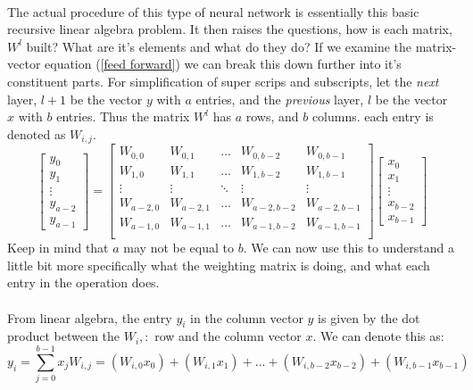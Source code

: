 \documentclass[12pt,letterpaper]{article}
\begin{document}
\paragraph*{}The actual procedure of this type of neural network is essentially this basic recursive linear algebra problem. It then raises the questions, how is each matrix, $W^l$ built? What are it's elements and what do they do? If we examine the matrix-vector equation (\ref{feed forward}) we can break this down further into it's constituent parts.
For simplification of super scrips and subscripts, let the \textit{next} layer, $l+1$ be the vector $y$ with $a$ entries, and the \textit{previous} layer, $l$ be the vector $x$ with $b$ entries. Thus the matrix $W^l$ has $a$ rows, and $b$ columns. each entry is denoted as $W_{i,j}$.
\begin{equation}
\label{mat-vec feed}
\begin{bmatrix}
y_0 \\ y_1 \\ \vdots \\ y_{a-2} \\ y_{a-1}
\end{bmatrix} =
\begin{bmatrix}
W_{0,0} & W_{0,1} & \hdots & W_{0,b-2} & W_{0,b-1} \\
W_{1,0} & W_{1,1} & \hdots & W_{1,b-2} & W_{1,b-1} \\
\vdots & \vdots & \ddots & \vdots & \vdots \\
W_{a-2,0} & W_{a-2,1} & \hdots & W_{a-2,b-2} & W_{a-2,b-1} \\
W_{a-1,0} & W_{a-1,1} & \hdots & W_{a-1,b-2} & W_{a-1,b-1} \\
\end{bmatrix}
\begin{bmatrix}
x_0 \\ x_1 \\ \vdots \\ x_{b-2} \\ x_{b-1}
\end{bmatrix}
\end{equation}
Keep in mind that $a$ may not be equal to $b$. We can now use this to understand a little bit more specifically what the weighting matrix is doing, and what each entry in the operation does.
\paragraph*{}From linear algebra, the entry $y_i$ in the column vector $y$ is given by the dot product between the $W_i,:$ row and the column vector $x$. We can denote this as:
\begin{equation}
\label{mat-vec eqn}
y_i = \sum_{j=0}^{b-1}x_j W_{i,j} = 
(W_{i,0}x_0) + (W_{i,1}x_1) +  ... + 
(W_{i,b-2}x_{b-2}) + (W_{i,b-1}x_{b-1})
\end{equation}
\end{document}
